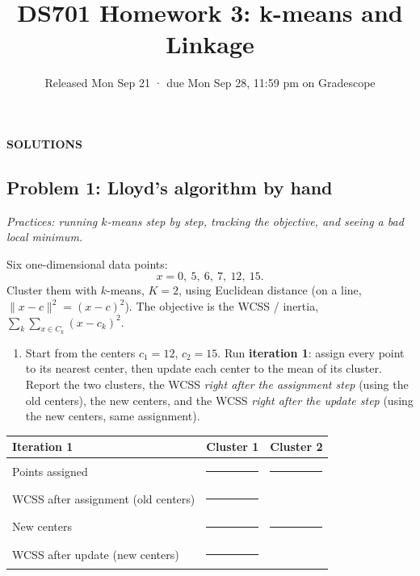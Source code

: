 \documentclass[
  11pt,
]{article}
\title{DS701 Homework 3: k-means and Linkage}
\subtitle{Released Mon Sep 21 · due Mon Sep 28, 11:59 pm on Gradescope}
\author{}
\date{}
\providecommand{\tightlist}{%
  \setlength{\itemsep}{0pt}\setlength{\parskip}{0pt}}
\newcommand{\answerspace}[1]{\par\vspace*{#1}}  %
\newcommand{\blank}[1][1.2in]{\rule{#1}{0.4pt}}
\newcommand{\answerpage}{\clearpage}
\begin{document}
\maketitle


\begin{center}\LARGE\bfseries\color{blue!45!black} SOLUTIONS\end{center}
\renewcommand{\answerspace}[1]{}
\renewcommand{\answerpage}{\par\vspace{6pt}}

\subsection{Problem 1: Lloyd's algorithm by
hand}\label{problem-1-lloyds-algorithm-by-hand}

\emph{Practices: running \(k\)-means step by step, tracking the
objective, and seeing a bad local minimum.}

Six one-dimensional data points: \[x = 0,\ 5,\ 6,\ 7,\ 12,\ 15 .\]
Cluster them with \(k\)-means, \(K = 2\), using Euclidean distance (on a
line, \(\|x-c\|^2 = (x-c)^2\)). The objective is the WCSS / inertia,
\(\sum_k \sum_{x\in C_k}(x-c_k)^2\).

\begin{enumerate}
\def\labelenumi{(\alph{enumi})}
\tightlist
\item
  Start from the centers \(c_1 = 12\), \(c_2 = 15\). Run
  \textbf{iteration 1}: assign every point to its nearest center, then
  update each center to the mean of its cluster. Report the two
  clusters, the WCSS \emph{right after the assignment step} (using the
  old centers), the new centers, and the WCSS \emph{right after the
  update step} (using the new centers, same assignment).
\end{enumerate}

\begin{longtable}[]{@{}lll@{}}
\toprule\noalign{}
Iteration 1 & Cluster 1 & Cluster 2 \\
\midrule\noalign{}
\endhead
\bottomrule\noalign{}
\endlastfoot
Points assigned & \blank[1.6in] & \blank[1.6in] \\
WCSS after assignment (old centers) & \blank[1.6in] & \\
New centers & \blank[1.6in] & \blank[1.6in] \\
WCSS after update (new centers) & \blank[1.6in] & \\
\end{longtable}
\end{document}
